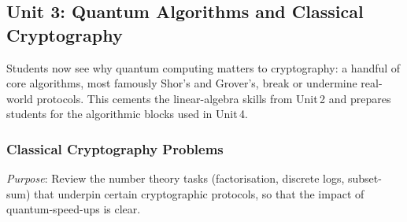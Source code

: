 \subsection{Unit 3: Quantum Algorithms and Classical Cryptography}

Students now see why quantum computing matters to cryptography:
a handful of core algorithms, most famously Shor's and Grover's, break or undermine real-world protocols. 
This cements the linear-algebra skills from Unit 2 and prepares students for the algorithmic blocks used in Unit 4.




\subsubsection{Classical Cryptography Problems}

\emph{Purpose}: Review the number theory tasks (factorisation, discrete logs, subset-sum) 
that underpin certain cryptographic protocols, so that the impact of quantum-speed-ups is clear.


